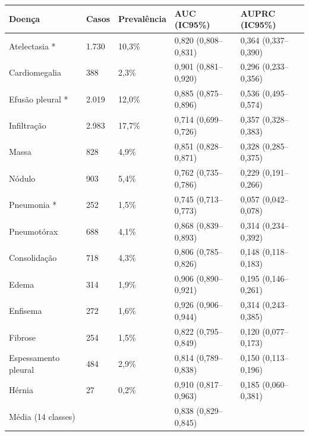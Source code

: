 \begin{tabular}{lllll}
\toprule
Doença & Casos & Prevalência & AUC (IC95\%) & AUPRC (IC95\%) \\
\midrule
Atelectasia * & 1.730 & 10,3\% & 0,820 (0,808–0,831) & 0,364 (0,337–0,390) \\
Cardiomegalia & 388 & 2,3\% & 0,901 (0,881–0,920) & 0,296 (0,233–0,356) \\
Efusão pleural * & 2.019 & 12,0\% & 0,885 (0,875–0,896) & 0,536 (0,495–0,574) \\
Infiltração & 2.983 & 17,7\% & 0,714 (0,699–0,726) & 0,357 (0,328–0,383) \\
Massa & 828 & 4,9\% & 0,851 (0,828–0,871) & 0,328 (0,285–0,375) \\
Nódulo & 903 & 5,4\% & 0,762 (0,735–0,786) & 0,229 (0,191–0,266) \\
Pneumonia * & 252 & 1,5\% & 0,745 (0,713–0,773) & 0,057 (0,042–0,078) \\
Pneumotórax & 688 & 4,1\% & 0,868 (0,839–0,893) & 0,314 (0,234–0,392) \\
Consolidação & 718 & 4,3\% & 0,806 (0,785–0,826) & 0,148 (0,118–0,183) \\
Edema & 314 & 1,9\% & 0,906 (0,890–0,921) & 0,195 (0,146–0,261) \\
Enfisema & 272 & 1,6\% & 0,926 (0,906–0,944) & 0,314 (0,243–0,385) \\
Fibrose & 254 & 1,5\% & 0,822 (0,795–0,849) & 0,120 (0,077–0,173) \\
Espessamento pleural & 484 & 2,9\% & 0,814 (0,789–0,838) & 0,150 (0,113–0,196) \\
Hérnia & 27 & 0,2\% & 0,910 (0,817–0,963) & 0,185 (0,060–0,381) \\
Média (14 classes) &  &  & 0,838 (0,829–0,845) &  \\
\bottomrule
\end{tabular}
